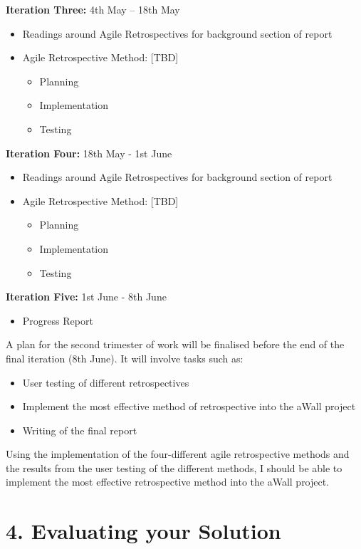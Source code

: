 \documentclass[11pt, a4paper, twoside, openright]{report}
\begin{document}
\textbf{Iteration Three:}  4th May – 18th May
\begin{itemize}
\item Readings around Agile Retrospectives for background section of report
\item Agile Retrospective Method: [TBD]
	\begin{itemize}
		\item Planning
        \item Implementation
        \item Testing
	\end{itemize}
\end{itemize}

\textbf{Iteration Four:}  18th May - 1st June
\begin{itemize}
\item Readings around Agile Retrospectives for background section of report
\item Agile Retrospective Method: [TBD]
	\begin{itemize}
		\item Planning
        \item Implementation
        \item Testing
	\end{itemize}
\end{itemize}

\textbf{Iteration Five:}  1st June - 8th June
\begin{itemize}
\item Progress Report \\
\end{itemize}

A plan for the second trimester of work will be finalised before the end of the final iteration (8th June). It will involve tasks such as:
\begin{itemize}
\item User testing of different retrospectives
\item Implement the most effective method of retrospective into the aWall project
\item Writing of the final report
\end{itemize}

Using the implementation of the four-different agile retrospective methods and the results from the user testing of the different methods, I should be able to implement the most effective retrospective method into the aWall project. 


\section*{4. Evaluating your Solution}
\end{document}
